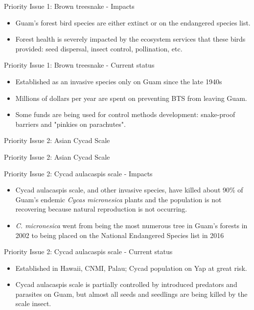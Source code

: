 \documentclass[]{beamer}
\begin{document}
\begin{frame}{Priority Issue 1: Brown treesnake - Impacts}
	\begin{itemize}
		\item Guam's forest bird species are either extinct or on the endangered species list.
		\item Forest health is severely impacted by the ecosystem services that these birds provided: seed dispersal, insect control, pollination, etc.
	\end{itemize}	
\end{frame}

\begin{frame}{Priority Issue 1: Brown treesnake - Current status}
\begin{itemize}
	\item Established as an invasive species only on Guam since the late 1940s
	\item Millions of dollars per year are spent on preventing BTS from leaving Guam.
	\item Some funds are being used for control methods development: snake-proof barriers and "pinkies on parachutes".
\end{itemize}	
\end{frame}

\begin{frame}{Priority Issue 2: Asian Cycad Scale}
\end{frame}

\begin{frame}{Priority Issue 2: Asian Cycad Scale}
\end{frame}

\begin{frame}{Priority Issue 2: Cycad aulacaspis scale - Impacts}
	\begin{itemize}
		\item Cycad aulacaspis scale, and other invasive species, have killed about 90\% of Guam's endemic \textit{Cycas micronesica} plants and the population is not recovering because natural reproduction is not occurring.
		\item{\textit{C. micronesica} went from being the most numerous tree in Guam's forests in 2002 to being placed on the National Endangered Species list in 2016}
	\end{itemize}
\end{frame}

\begin{frame}{Priority Issue 2: Cycad aulacaspis scale - Current status}
\begin{itemize}
	\item Established in Hawaii, CNMI, Palau; Cycad population on Yap at great risk.
	\item Cycad aulacaspis scale is partially controlled by introduced predators and parasites on Guam, but almost all seeds and seedlings are being killed by the scale insect.
\end{itemize}	
\end{frame}
\end{document}
